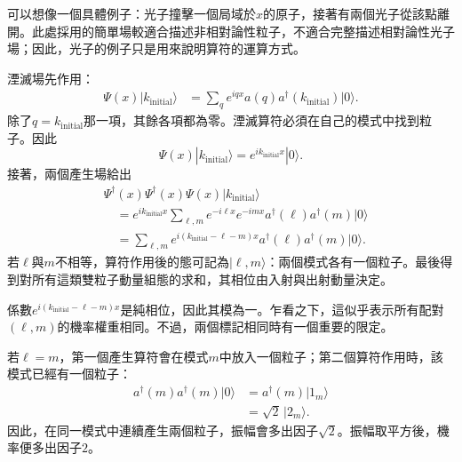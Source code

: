 可以想像一個具體例子：光子撞擊一個局域於\(x\)的原子，接著有兩個光子從該點離開。此處採用的簡單場較適合描述非相對論性粒子，不適合完整描述相對論性光子場；因此，光子的例子只是用來說明算符的運算方式。

湮滅場先作用：
\begin{align}
\Psi(x)|k_{\mathrm{initial}}\rangle
&=\sum_q e^{iqx}a(q)a^\dagger(k_{\mathrm{initial}})|0\rangle.
\end{align}
除了\(q=k_{\mathrm{initial}}\)那一項，其餘各項都為零。湮滅算符必須在自己的模式中找到粒子。因此
\begin{equation}
\Psi(x)|k_{\mathrm{initial}}\rangle
=e^{ik_{\mathrm{initial}}x}|0\rangle.
\end{equation}
接著，兩個產生場給出
\begin{align}
&\Psi^\dagger(x)\Psi^\dagger(x)\Psi(x)
|k_{\mathrm{initial}}\rangle
\\
&\quad=
e^{ik_{\mathrm{initial}}x}
\sum_{\ell,m}
e^{-i\ell x}e^{-imx}
a^\dagger(\ell)a^\dagger(m)|0\rangle
\\
&\quad=
\sum_{\ell,m}
e^{i(k_{\mathrm{initial}}-\ell-m)x}
a^\dagger(\ell)a^\dagger(m)|0\rangle.
\end{align}
若\(\ell\)與\(m\)不相等，算符作用後的態可記為\(|\ell,m\rangle\)：兩個模式各有一個粒子。最後得到對所有這類雙粒子動量組態的求和，其相位由入射與出射動量決定。

\begin{classroomqa}
\end{classroomqa}

\begin{classroomqa}
\end{classroomqa}

係數\(e^{i(k_{\mathrm{initial}}-\ell-m)x}\)是純相位，因此其模為一。乍看之下，這似乎表示所有配對\((\ell,m)\)的機率權重相同。不過，兩個標記相同時有一個重要的限定。

若\(\ell=m\)，第一個產生算符會在模式\(m\)中放入一個粒子；第二個算符作用時，該模式已經有一個粒子：
\begin{align}
a^\dagger(m)a^\dagger(m)|0\rangle
&=a^\dagger(m)|1_m\rangle\\
&=\sqrt{2}\,|2_m\rangle.
\end{align}
因此，在同一模式中連續產生兩個粒子，振幅會多出因子\(\sqrt{2}\)。振幅取平方後，機率便多出因子\(2\)。

